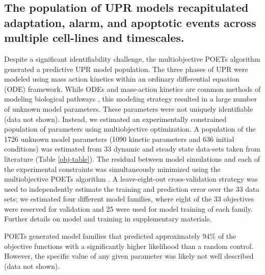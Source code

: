 \documentclass[fleqn,10pt]{wlscirep}
\begin{document}
\subsection*{The population of UPR models recapitulated adaptation, alarm, and apoptotic events across multiple cell-lines and timescales.} 
Despite a significant identifiability challenge, the multiobjective POETs algorithm generated a predictive UPR model population. The three phases of UPR were modeled using mass action kinetics within an ordinary differential equation (ODE) framework. While ODEs and mass-action kinetics are common methods of modeling biological pathways \cite{Schoeberl:2002rv, Chen:2009uq, Helmy:2009kx}, this modeling strategy resulted in a large number of unknown model parameters. These parameters were not uniquely identifiable (data not shown). Instead, we estimated an experimentally constrained population of parameters using multiobjective optimization. A population of the 1726 unknown model parameters (1090 kinetic parameters and 636 initial conditions) was estimated from 33 dynamic and steady state data-sets taken from literature (Table \ref{obj-table}). The residual between model simulations and each of the experimental constraints was simultaneously minimized using the multiobjective POETs algorithm \cite{Song:2010ij}. A leave-eight-out cross-validation strategy was used to independently estimate the training and prediction error over the 33 data sets; we estimated four different model families, where eight of the 33 objectives were reserved for validation and 25 were used for model training of each family. Further details on model and training in supplementary materials. 
\iffalse Thus, each model family was trained and validated on different experimental data. Starting from an initial best-fit initial parameter set (nominal set), more than 25,000 probable models were estimated by POETs from which we selected N = 100 models (25 from each training family) with a Pareto rank of one or less (from approximately 1200 possible choices) for further study. The nominal, training (75 models), and prediction (25 models) errors were calculated for each objective (Table \ref{obj-table}). Models used for prediction error calculations for a particular objective were \emph{not} trained on that objective. The prediction likelihood was statistically significantly better for 31 of the 33 objective functions at a 95\% confidence level, compared with random parameter sets generated from the nominal set (Table \ref{obj-table}). 
\fi 
POETs generated model families that predicted approximately 94\% of the objective functions with a significantly higher likelihood than a random control. However, the specific value of any given parameter was likely not well described (data not shown). 
\end{document}
